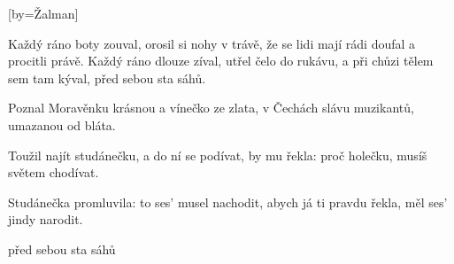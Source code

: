 [by={Žalman}]

\beginchorus{}
Každý ráno boty zouval, orosil si nohy v trávě,
že se lidi mají rádi doufal a procitli právě.
Každý ráno dlouze zíval, utřel čelo do rukávu,
a při chůzi tělem sem tam kýval, před sebou sta sáhů.
\endchorus{}

\beginverse{}
Poznal Moravěnku krásnou a vínečko ze zlata,
v Čechách slávu muzikantů, umazanou od bláta.
\endverse{}

\beginchorus{}
\phantom{}
\endchorus{}

\beginverse{}
Toužil najít studánečku, a do ní se podívat,
by mu řekla: proč holečku, musíš světem chodívat.
\endverse{}

\beginverse{}
Studánečka promluvila: to ses' musel nachodit,
abych já ti pravdu řekla, měl ses' jindy narodit.
\endverse{}

\beginchorus{}

\lrep{} před sebou sta sáhů \rrep{}
\endchorus{}

\endsong{}
